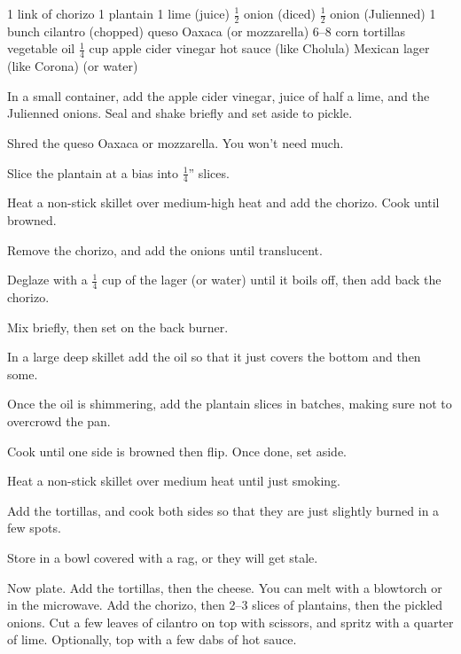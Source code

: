 \dishtype{\main}
\begin{ingreds}
    1 link of chorizo
    1 plantain
    1 lime (juice)
    $\frac{1}{2}$ onion (diced)
    $\frac{1}{2}$ onion (Julienned)
    1 bunch cilantro (chopped)
    queso Oaxaca (or mozzarella)
    6--8 corn tortillas
    vegetable oil
    $\frac{1}{4}$ cup apple cider vinegar
    hot sauce (like Cholula\textsuperscript{\textregistered})
    Mexican lager (like Corona\textsuperscript{\textregistered}) (or water)  
\end{ingreds}
\begin{method}
    In a small container, add the apple cider vinegar, juice of half a lime, and the Julienned onions. Seal and shake briefly and set aside to pickle.\par
    Shred the queso Oaxaca or mozzarella. You won't need much.\par
    Slice the plantain at a bias into $\frac{1}{4}$'' slices.\par
    Heat a non-stick skillet over medium-high heat and add the chorizo. Cook until browned.\par
    Remove the chorizo, and add the onions until translucent.\par
    Deglaze with a $\frac{1}{4}$ cup of the lager (or water) until it boils off, then add back the chorizo.\par
    Mix briefly, then set on the back burner.\par
    In a large deep skillet add the oil so that it just covers the bottom and then some.\par
    Once the oil is shimmering, add the plantain slices in batches, making sure not to overcrowd the pan.\par
    Cook until one side is browned then flip. Once done, set aside.\par
    Heat a non-stick skillet over medium heat until just smoking.\par
    Add the tortillas, and cook both sides so that they are just slightly burned in a few spots.\par
    Store in a bowl covered with a rag, or they will get stale.\par
    Now plate. Add the tortillas, then the cheese. You can melt with a blowtorch or in the microwave. Add the chorizo, then 2--3 slices of plantains, then the pickled onions. Cut a few leaves of cilantro on top with scissors, and spritz with a quarter of lime. Optionally, top with a few dabs of hot sauce.
\end{method}